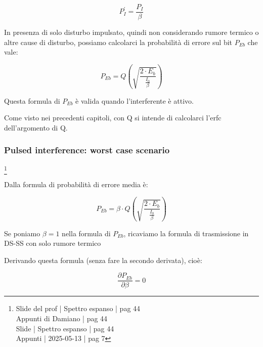 {
    \Large 
    \begin{equation}
        P_I^{'}
        = 
        \frac{P_I}{\beta}
    \end{equation}
}

In presenza di solo disturbo impulsato, 
quindi non considerando rumore termico o altre cause di disturbo, 
possiamo calcolarci la probabilità di errore sul bit $P_{Eb}$ che vale: 

{
    \Large 
    \begin{equation}
        P_{Eb}
        = 
        Q 
        \left(
            \sqrt{\frac{2 \cdot E_b}{\frac{I_0}{\beta}}}
        \right)
    \end{equation}
}

Questa formula di $P_{Eb}$ è valida quando l'interferente è attivo. \newline 

Come visto nei precedenti capitoli, con Q si intende di calcolarci l'erfc dell'argomento di Q. \newline 

\newpage 

\subsubsection{Pulsed interference: worst case scenario}
\footnote{Slide del prof | Spettro espanso | pag 44 \\
Appunti di Damiano | pag 44 \\
Slide | Spettro espanso | pag 44 \\
Appunti | 2025-05-13 | pag 7 
} 

Dalla formula di probabilità di errore media è: 

{
    \Large 
    \begin{equation}
        P_{Eb}
        =
        \beta
        \cdot
           Q 
        \left(
            \sqrt{\frac{2 \cdot E_b}{\frac{I_0}{\beta}}}
        \right)
    \end{equation}
}

\begin{tcolorbox}
Se poniamo $\beta = 1$ nella formula di $P_{Eb}$, ricaviamo la formula di trasmissione in DS-SS con solo rumore termico    
\end{tcolorbox}

Derivando questa formula (senza fare la secondo derivata), 
cioè:

{
    \Large 
    \begin{equation}
        \frac{\partial P_{Eb}}{\partial \beta}
        = 
        0
    \end{equation}
}

